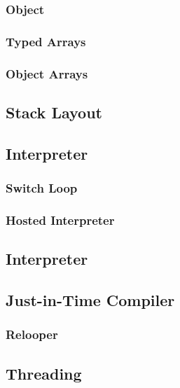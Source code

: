 \documentclass{acm_proc_article-sp}
\begin{document}
\subsubsection{Object}

\subsubsection{Typed Arrays}

\subsubsection{Object Arrays}

\subsection{Stack Layout}

\subsection{Interpreter}

\subsubsection{Switch Loop}

\subsubsection{Hosted Interpreter}

\subsection{Interpreter}

\subsection{Just-in-Time Compiler}

\subsubsection{Relooper}

\subsection{Threading}
\end{document}
